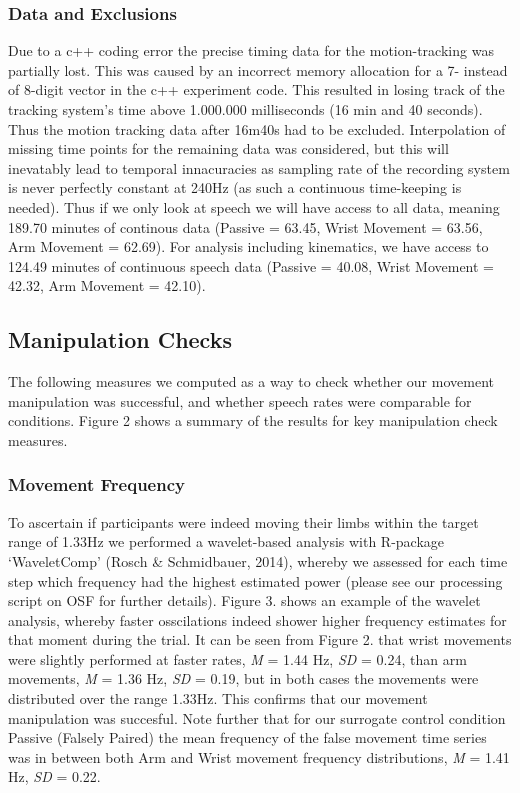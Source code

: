 \documentclass[
  man, noextraspace,floatsintext]{apa6}
\begin{document}
\hypertarget{data-and-exclusions}{%
\subsubsection{Data and Exclusions}\label{data-and-exclusions}}

Due to a c++ coding error the precise timing data for the motion-tracking was partially lost. This was caused by an incorrect memory allocation for a 7- instead of 8-digit vector in the c++ experiment code. This resulted in losing track of the tracking system's time above 1.000.000 milliseconds (16 min and 40 seconds). Thus the motion tracking data after 16m40s had to be excluded. Interpolation of missing time points for the remaining data was considered, but this will inevatably lead to temporal innacuracies as sampling rate of the recording system is never perfectly constant at 240Hz (as such a continuous time-keeping is needed). Thus if we only look at speech we will have access to all data, meaning 189.70 minutes of continous data (Passive = 63.45, Wrist Movement = 63.56, Arm Movement = 62.69). For analysis including kinematics, we have access to 124.49 minutes of continuous speech data (Passive = 40.08, Wrist Movement = 42.32, Arm Movement = 42.10).

\hypertarget{manipulation-checks}{%
\subsection{Manipulation Checks}\label{manipulation-checks}}

The following measures we computed as a way to check whether our movement manipulation was successful, and whether speech rates were comparable for conditions. Figure 2 shows a summary of the results for key manipulation check measures.

\hypertarget{movement-frequency}{%
\subsubsection{Movement Frequency}\label{movement-frequency}}

To ascertain if participants were indeed moving their limbs within the target range of 1.33Hz we performed a wavelet-based analysis with R-package `WaveletComp' (Rosch \& Schmidbauer, 2014), whereby we assessed for each time step which frequency had the highest estimated power (please see our processing script on OSF for further details). Figure 3. shows an example of the wavelet analysis, whereby faster osscilations indeed shower higher frequency estimates for that moment during the trial. It can be seen from Figure 2. that wrist movements were slightly performed at faster rates, \emph{M} = 1.44 Hz, \emph{SD} = 0.24, than arm movements, \emph{M} = 1.36 Hz, \emph{SD} = 0.19, but in both cases the movements were distributed over the range 1.33Hz. This confirms that our movement manipulation was succesful. Note further that for our surrogate control condition Passive (Falsely Paired) the mean frequency of the false movement time series was in between both Arm and Wrist movement frequency distributions, \emph{M} = 1.41 Hz, \emph{SD} = 0.22.
\end{document}
